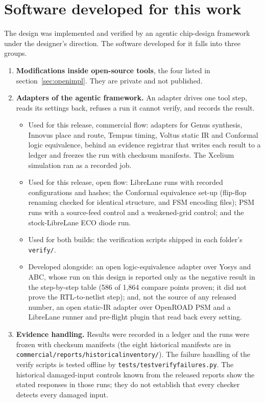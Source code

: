 \documentclass[11pt,letterpaper]{article}
\newcommand{\sk}[1]{\texttt{#1}}
\renewcommand{\_}{\textunderscore\penalty0\hskip0pt\relax}
\begin{document}
\section{Software developed for this work}\label{sec:software}
The design was implemented and verified by an agentic chip-design framework under the designer's direction. The software developed for it falls into three groups.
\begin{enumerate}
\item \textbf{Modifications inside open-source tools}, the four listed in section~\ref{sec:openimpl}. They are private and not published.
\item \textbf{Adapters of the agentic framework.} An adapter drives one tool step, reads its settings back, refuses a run it cannot verify, and records the result.
\begin{itemize}
\item Used for this release, commercial flow: adapters for Genus synthesis, Innovus place and route, Tempus timing, Voltus static IR and Conformal logic equivalence, behind an evidence registrar that writes each result to a ledger and freezes the run with checksum manifests. The Xcelium simulation ran as a recorded job.
\item Used for this release, open flow: LibreLane runs with recorded configurations and hashes; the Conformal equivalence set-up (flip-flop renaming checked for identical structure, and FSM encoding files); PSM runs with a source-feed control and a weakened-grid control; and the stock-LibreLane ECO diode run.
\item Used for both builds: the verification scripts shipped in each folder's \sk{verify/}.
\item Developed alongside: an open logic-equivalence adapter over Yosys and ABC, whose run on this design is reported only as the negative result in the step-by-step table (586 of 1,864 compare points proven; it did not prove the RTL-to-netlist step); and, not the source of any released number, an open static-IR adapter over OpenROAD PSM and a LibreLane runner and pre-flight plugin that read back every setting.
\end{itemize}
\item \textbf{Evidence handling.} Results were recorded in a ledger and the runs were frozen with checksum manifests (the eight historical manifests are in \sk{commercial/reports/historical\_inventory/}). The failure handling of the verify scripts is tested offline by \sk{tests/test\_verify\_failures.py}. The historical damaged-input controls known from the released reports show the stated responses in those runs; they do not establish that every checker detects every damaged input.
\end{enumerate}
\end{document}
